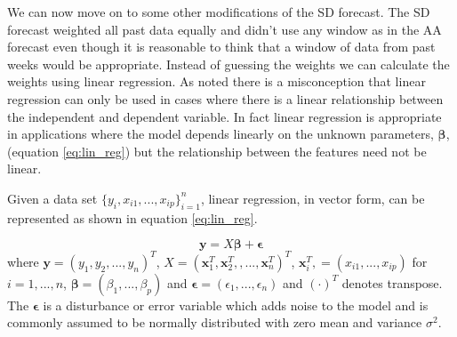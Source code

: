 We can now move on to some other modifications of the SD forecast. The SD forecast weighted all past data equally and didn't use any window as in the AA forecast even though it is reasonable to think that a window of data from past weeks would be appropriate. Instead of guessing the weights we can calculate the weights using linear regression. As \cite{hong16} noted there is a misconception that linear regression can only be used in cases where there is a linear relationship between the independent and dependent variable. In fact linear regression is appropriate in applications where the model depends linearly on the unknown parameters, $\boldsymbol \beta$, (equation \ref{eq:lin_reg}) but the relationship between the features need not be linear.

Given a data set $\{y_i, x_{i1}, ... , x_{ip}\}_{i=1}^n$, linear regression, in vector form, can be represented as shown in equation \ref{eq:lin_reg}.

\begin{equation} \label{eq:lin_reg}
\textbf{y} = X \boldsymbol \beta +\boldsymbol \epsilon
\end{equation}
where $\textbf{y} = (y_1, y_2, ... , y_n)^T $, $X =  (\textbf{x}_1^T, \textbf{x}_2^T,, ... ,\textbf{x}_n^T)^T$,  $\textbf{x}_i^T, = (x_{i1}, ... , x_{ip})$ for $i = 1, ... , n$, $\boldsymbol \beta = (\beta_1 , ... , \beta_p)$ and $\boldsymbol \epsilon = (\epsilon_1, ... , \epsilon_n)$ and $( \cdot )^T$ denotes transpose. The $\boldsymbol \epsilon$ is a disturbance or error variable which adds noise to the model and is commonly assumed to be normally distributed with zero mean and variance $\sigma^2$.


